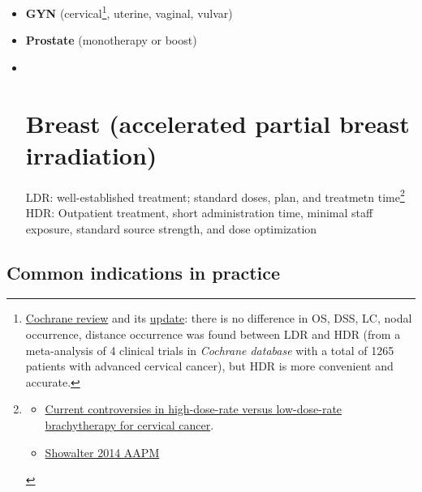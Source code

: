 \documentclass[]{book}
\providecommand{\tightlist}{%
  \setlength{\itemsep}{0pt}\setlength{\parskip}{0pt}}
\let\rmarkdownfootnote\footnote%
\def\footnote{\protect\rmarkdownfootnote}
\theoremstyle{definition}
\theoremstyle{definition}
\theoremstyle{definition}
\theoremstyle{remark}
\begin{document}
\begin{itemize}
\item
  \textbf{GYN} (cervical\footnote{\href{http://cochranelibrary-wiley.com/doi/10.1002/14651858.CD007563.pub2/abstract}{Cochrane
    review} and its
    \href{https://www.ncbi.nlm.nih.gov/m/pubmed/25300170/?i=5\&from=/10432431/related}{update}:
    there is no difference in OS, DSS, LC, nodal occurrence, distance
    occurrence was found between LDR and HDR (from a meta-analysis of 4
    clinical trials in \emph{Cochrane database} with a total of 1265
    patients with advanced cervical cancer), but HDR is more convenient
    and accurate.}, uterine, vaginal, vulvar)
\item
  \textbf{Prostate} (monotherapy or boost)
\item ~
  \chapter{\texorpdfstring{\textbf{Breast} (accelerated partial breast
  irradiation)}{Breast (accelerated partial breast irradiation)}}\label{breast-accelerated-partial-breast-irradiation}

  LDR: well-established treatment; standard doses, plan, and treatmetn
  time\footnote{\begin{itemize}
    \tightlist
    \item
      \href{https://www.ncbi.nlm.nih.gov/pubmed/16874815}{Current
      controversies in high-dose-rate versus low-dose-rate brachytherapy
      for cervical cancer}.
    \item
      \href{https://www.aapm.org/education/vl/vl.asp?id=3911\%5D}{Showalter
      2014 AAPM}
    \end{itemize}}\\
  HDR: Outpatient treatment, short administration time, minimal staff
  exposure, standard source strength, and dose optimization
\end{itemize}

\section{Common indications in
practice}\label{common-indications-in-practice-1}
\end{document}
